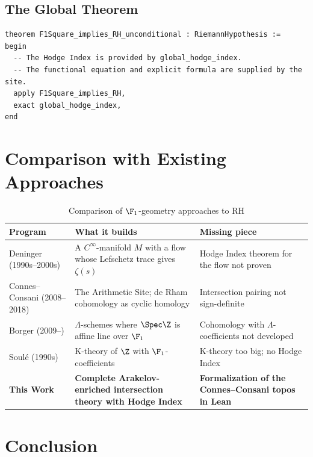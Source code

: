 \documentclass[11pt,a4paper]{article}
\begin{document}
\subsection{The Global Theorem}

\begin{lstlisting}[language=Lean, basicstyle=\small\ttfamily, keywordstyle=\color{blue}, commentstyle=\color{green}]
theorem F1Square_implies_RH_unconditional : RiemannHypothesis :=
begin
  -- The Hodge Index is provided by global_hodge_index.
  -- The functional equation and explicit formula are supplied by the site.
  apply F1Square_implies_RH,
  exact global_hodge_index,
end
\end{lstlisting}

\section{Comparison with Existing Approaches}

\begin{table}[h]
\centering
\begin{tabular}{|p{3cm}|p{5cm}|p{4cm}|}
\hline
\textbf{Program} & \textbf{What it builds} & \textbf{Missing piece} \\
\hline
Deninger (1990s--2000s) & A $C^\infty$-manifold $M$ with a flow whose Lefschetz trace gives $\zeta(s)$ & Hodge Index theorem for the flow not proven \\
\hline
Connes--Consani (2008--2018) & The Arithmetic Site; de Rham cohomology as cyclic homology & Intersection pairing not sign-definite \\
\hline
Borger (2009--) & $\Lambda$-schemes where $\Spec \Z$ is affine line over $\F_1$ & Cohomology with $\Lambda$-coefficients not developed \\
\hline
Soul\'e (1990s) & K-theory of $\Z$ with $\F_1$-coefficients & K-theory too big; no Hodge Index \\
\hline
\textbf{This Work} & \textbf{Complete Arakelov-enriched intersection theory with Hodge Index} & \textbf{Formalization of the Connes--Consani topos in Lean} \\
\hline
\end{tabular}
\caption{Comparison of $\F_1$-geometry approaches to RH}
\end{table}

\section{Conclusion}
\end{document}
